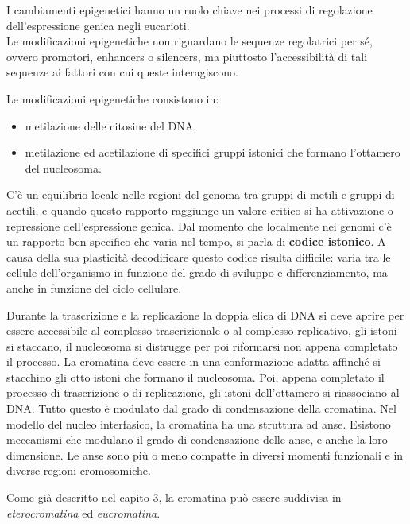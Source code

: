 \documentclass[11pt]{book}
\begin{document}
I cambiamenti epigenetici hanno un ruolo chiave nei processi di regolazione dell’espressione genica negli eucarioti.\\
Le modificazioni epigenetiche non riguardano le sequenze regolatrici per sé, ovvero promotori, enhancers o silencers, ma piuttosto l’accessibilità di tali sequenze ai fattori con cui queste interagiscono.

Le modificazioni epigenetiche consistono in:
\begin{itemize}
\item metilazione delle citosine del DNA,
\item metilazione ed acetilazione di specifici gruppi istonici che formano l’ottamero del nucleosoma. 
\end{itemize}

C’è un equilibrio locale nelle regioni del genoma tra gruppi di metili e gruppi di acetili, e quando questo rapporto raggiunge un valore critico si ha attivazione o repressione dell’espressione genica. Dal momento che localmente nei genomi c’è un rapporto ben specifico che varia nel tempo, si parla di \textbf{codice istonico}. A causa della sua plasticità decodificare questo codice risulta difficile: varia tra le cellule dell’organismo in funzione del grado di sviluppo e differenziamento, ma anche in funzione del ciclo cellulare.

Durante la trascrizione e la replicazione la doppia elica di DNA si deve aprire per essere accessibile al complesso trascrizionale o al complesso replicativo, gli istoni si staccano, il nucleosoma si distrugge per poi riformarsi non appena completato il processo. La cromatina deve essere in una conformazione adatta affinché si stacchino gli otto istoni che formano il nucleosoma. Poi, appena completato il processo di trascrizione o di replicazione, gli istoni dell’ottamero si riassociano al DNA. Tutto questo è modulato dal grado di condensazione della cromatina. Nel modello del nucleo interfasico, la cromatina ha una struttura ad anse. Esistono meccanismi che modulano il grado di condensazione delle anse, e anche la loro dimensione. Le anse sono più o meno compatte in diversi momenti funzionali e in diverse regioni cromosomiche.

Come già descritto nel capito 3, la cromatina può essere suddivisa in \emph{eterocromatina} ed \emph{eucromatina}.
\end{document}
